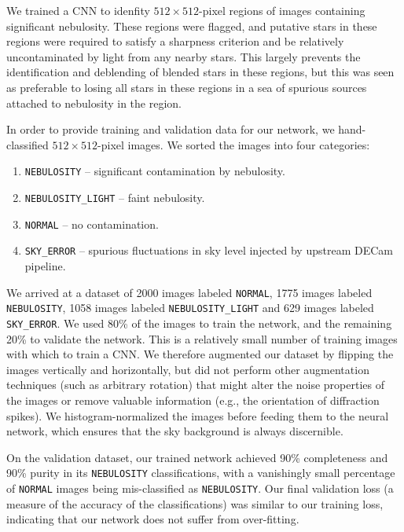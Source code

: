 \documentclass[12pt,twocolumn]{article}
\begin{document}

We trained a CNN to idenfity $512 \times 512$-pixel regions of images containing significant nebulosity. These regions were flagged, and putative stars in these regions were required to satisfy a sharpness criterion and be relatively uncontaminated by light from any nearby stars. This largely prevents the identification and deblending of blended stars in these regions, but this was seen as preferable to losing all stars in these regions in a sea of spurious sources attached to nebulosity in the region.

In order to provide training and validation data for our network, we hand-classified $512 \times 512$-pixel images. We sorted the images into four categories:
\begin{enumerate}
    \itemsep0em
    \item \texttt{NEBULOSITY} -- significant contamination by nebulosity.
    \item \texttt{NEBULOSITY\_LIGHT} -- faint nebulosity.
    \item \texttt{NORMAL} -- no contamination.
    \item \texttt{SKY\_ERROR} -- spurious fluctuations in sky level injected by upstream DECam pipeline.
\end{enumerate}
We arrived at a dataset of 2000 images labeled \texttt{NORMAL}, 1775 images labeled \texttt{NEBULOSITY}, 1058 images labeled \texttt{NEBULOSITY\_LIGHT} and 629 images labeled \texttt{SKY\_ERROR}. We used 80\% of the images to train the network, and the remaining 20\% to validate the network. This is a relatively small number of training images with which to train a CNN. We therefore augmented our dataset by flipping the images vertically and horizontally, but did not perform other augmentation techniques (such as arbitrary rotation) that might alter the noise properties of the images or remove valuable information (e.g., the orientation of diffraction spikes). We histogram-normalized the images before feeding them to the neural network, which ensures that the sky background is always discernible.

On the validation dataset, our trained network achieved 90\% completeness and 90\% purity in its \texttt{NEBULOSITY} classifications, with a vanishingly small percentage of \texttt{NORMAL} images being mis-classified as \texttt{NEBULOSITY}. Our final validation loss (a measure of the accuracy of the classifications) was similar to our training loss, indicating that our network does not suffer from over-fitting.
\end{document}
